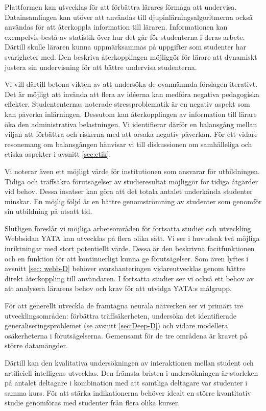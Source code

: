 Plattformen kan utvecklas för att förbättra lärares förmåga att undervisa. Datainsamlingen kan utöver att användas till djupinlärningsalgoritmerna också användas för att återkoppla information till läraren. Informationen kan exempelvis bestå av statistik över hur det går för studenterna i deras arbete. Därtill skulle läraren kunna uppmärksammas på uppgifter som studenter har svårigheter med. Den beskriva återkopplingen möjliggör för lärare att dynamiskt justera sin undervisning för att bättre undervisa studenterna.

Vi vill därtill betona vikten av att undersöka de ovannämnda förslagen iterativt. Det är möjligt att invända att flera av idéerna kan medföra negativa pedagogiska effekter. Studententernas noterade stressproblematik är en negativ aspekt som kan påverka inlärningen. Dessutom kan återkopplingen av information till lärare öka den administrativa belastningen. Vi identifierar därför en balansgång mellan viljan att förbättra och riskerna med att orsaka negativ påverkan. För ett vidare resonemang om balansgången hänvisar vi till diskussionen om samhälleliga och etiska aspekter i avsnitt \ref{sec:etik}.

Vi noterar även ett möjligt värde för institutionen som ansvarar för utbildningen. Tidiga och träffsäkra förutsägelser av studieresultat möjliggör för tidiga åtgärder vid behov. Dessa insatser kan göra att det totala antalet underkända studenter minskar. En möjlig följd är en bättre genomströmning av studenter som genomför sin utbildning på utsatt tid.

Slutligen föreslår vi möjliga arbetsområden för fortsatta studier och utveckling. Webbsidan YATA kan utvecklas på flera olika sätt. Vi ser i huvudsak två möjliga inriktningar med stort potentiellt värde. Dessa är den beskrivna facitfunktionen och en funktion för att kontinuerligt kunna ge förutsägelser. Som även lyftes i avsnitt \ref{sec: webb-D} behöver svarshanteringen vidareutvecklas genom bättre direkt återkoppling till användaren. I fortsatta studier ser vi också ett behov av att analysera lärarens behov och krav för att utvidga YATA:s målgrupp.

För att generellt utveckla de framtagna neurala nätverken ser vi primärt tre utvecklingsområden: förbättra träffsäkerheten, undersöka det identifierade generaliseringsproblemet (se avsnitt \ref{sec:Deep-D}) och vidare modellera osäkerheterna i förutsägelserna. Gemensamt för de tre områdena är kravet på större datamängder.

Därtill kan den kvalitativa undersökningen av interaktionen mellan student och artificiell intelligens utvecklas. Den främsta bristen i undersökningen är storleken på antalet deltagare i kombination med att samtliga deltagare var studenter i samma kurs. För att stärka indikationerna behöver idealt en större kvantitativ studie genomföras med studenter från flera olika kurser.


